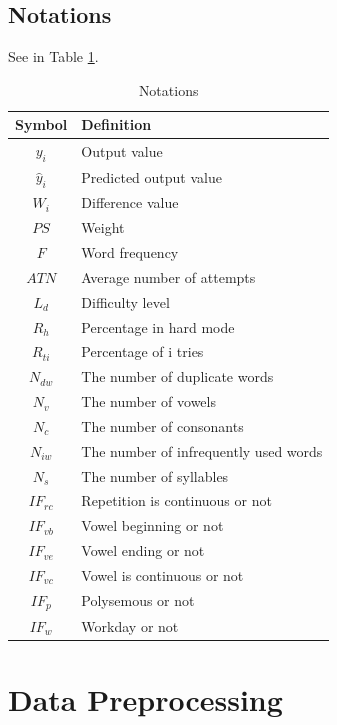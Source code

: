 \documentclass[12pt]{article}  %
\begin{document}
\subsection{Notations}
See in Table \ref{tb:notation}.
\begin{table}[!htbp]
\begin{center}
\caption{Notations}
\begin{tabular}{cl}
	\toprule
	\multicolumn{1}{m{3cm}}{\centering Symbol}
	&\multicolumn{1}{m{8cm}}{\centering Definition}\\
	\midrule
    
	$y_i$&Output value\\
	$\hat{y}_i$&Predicted output value\\
	$W_i$ &Difference value\\
    $PS$ &Weight\\
    $F$ &Word frequency\\
    $ATN$ &Average number of attempts\\
    $L_d$ &Difficulty level\\
    $R_h$ &Percentage in hard mode\\
    $R_{ti}$ &Percentage of i tries\\
    $N_{dw}$ &The number of duplicate words\\
    $N_v$ &The number of vowels\\
    $N_c$ &The number of consonants\\
    $N_{iw}$ &The number of infrequently used words\\
    $N_s$ &The number of syllables\\
    $IF_{rc}$ &Repetition is continuous or not\\
    $IF_{vb}$ &Vowel beginning or not\\
    $IF_{ve}$ &Vowel ending or not\\
    $IF_{vc}$ &Vowel is continuous or not\\
    $IF_{p}$ &Polysemous or not\\
    $IF_{w}$ &Workday or not\\

	\bottomrule
\end{tabular}\label{tb:notation}
\end{center}
\end{table}




\section{Data Preprocessing}
\end{document}
